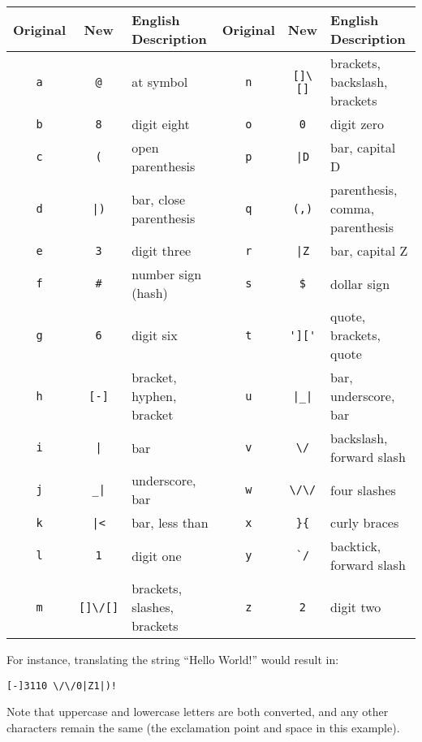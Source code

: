 \begin{center}
    \begin{tabular}{|c|c|l||c|c|l|}
        \hline
        Original & New & English Description & Original & New & English Description\\
        \hline
        \verb+a+ & \verb+@+         & at symbol                                 &  \verb+n+ & \verb+[]\[]+     & brackets, backslash, brackets\\
        \verb+b+ & \verb+8+         & digit eight                               &  \verb+o+ & \verb+0+         & digit zero \\
        \verb+c+ & \verb+(+         & open parenthesis                          &  \verb+p+ & \verb+|D+        & bar, capital D\\
        \verb+d+ & \verb+|)+        & bar, close parenthesis                    &  \verb+q+ & \verb+(,)+       & parenthesis, comma, parenthesis \\
        \verb+e+ & \verb+3+         & digit three                               &  \verb+r+ & \verb+|Z+        & bar, capital Z \\
        \verb+f+ & \verb+#+         & number sign (hash)                        &  \verb+s+ & \verb+$+         & dollar sign\\
        \verb+g+ & \verb+6+         & digit six                                 &  \verb+t+ & \verb+']['+      & quote, brackets, quote \\
        \verb+h+ & \verb+[-]+       & bracket, hyphen, bracket                  &  \verb+u+ & \verb+|_|+       & bar, underscore, bar\\
        \verb+i+ & \verb+|+         & bar                                       &  \verb+v+ & \verb+\/+        & backslash, forward slash \\
        \verb+j+ & \verb+_|+        & underscore, bar                           &  \verb+w+ & \verb+\/\/+      & four slashes \\
        \verb+k+ & \verb+|<+        & bar, less than                            &  \verb+x+ & \verb+}{+        & curly braces \\
        \verb+l+ & \verb+1+         & digit one                                 &  \verb+y+ & \verb+`/+        & backtick, forward slash\\
        \verb+m+ & \verb+[]\/[]+    & brackets, slashes, brackets               &  \verb+z+ & \verb+2+         & digit two\\
        \hline
    \end{tabular}
\end{center}
For instance, translating the string ``Hello World!'' would result in:
\begin{center}
\verb+[-]3110 \/\/0|Z1|)!+
\end{center}
Note that uppercase and lowercase letters are both converted, and any other characters remain the same (the exclamation point and space in this example).
